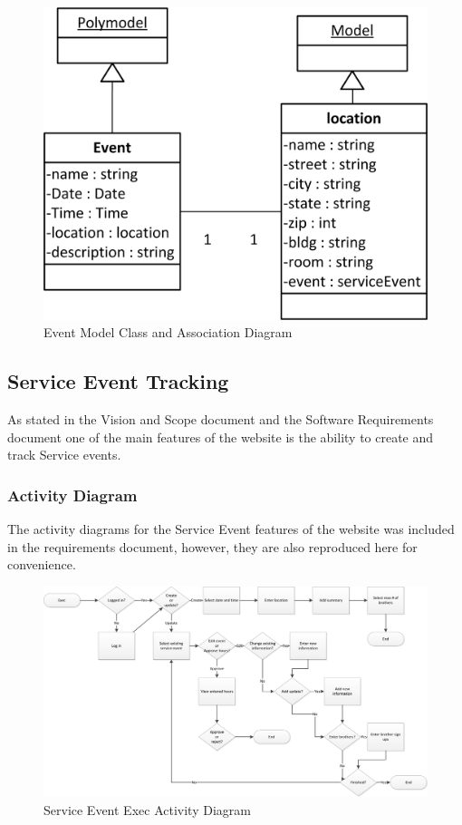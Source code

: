 \documentclass{article}
\begin{document}
\FloatBarrier
\begin{figure}[h!]
\centering
\includegraphics[scale=.65]{img/modelDiagrams/eventModel}
\caption{Event Model Class and Association Diagram}
\label{fig:eventModelDiagram}
\end{figure}
\FloatBarrier

\subsection{Service Event Tracking}

As stated in the Vision and Scope document and the Software Requirements document one of the main features of the website is the ability to create and track Service events.

\subsubsection{Activity Diagram}

The activity diagrams for the Service Event features of the website was included in the requirements document, however, they are also reproduced here for convenience.

\FloatBarrier
\begin{figure}
\centering
\includegraphics[scale=.65]{img/activityDiagrams/serviceEventActivity1}
\caption{Service Event Exec Activity Diagram}
\label{fig:serviceEventExecActivityDiagram}
\end{figure}
\FloatBarrier
\end{document}
